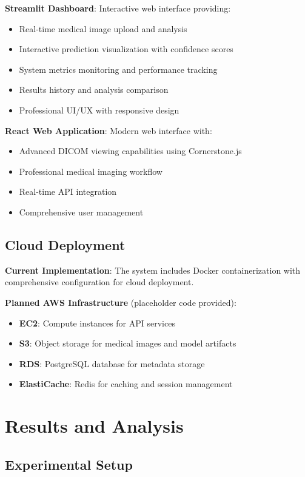\documentclass[12pt,a4paper]{article}
\begin{document}
\textbf{Streamlit Dashboard}: Interactive web interface providing:
\begin{itemize}
    \item Real-time medical image upload and analysis
    \item Interactive prediction visualization with confidence scores
    \item System metrics monitoring and performance tracking
    \item Results history and analysis comparison
    \item Professional UI/UX with responsive design
\end{itemize}

\textbf{React Web Application}: Modern web interface with:
\begin{itemize}
    \item Advanced DICOM viewing capabilities using Cornerstone.js
    \item Professional medical imaging workflow
    \item Real-time API integration
    \item Comprehensive user management
\end{itemize}

\subsection{Cloud Deployment}

\textbf{Current Implementation}: The system includes Docker containerization with comprehensive configuration for cloud deployment.

\textbf{Planned AWS Infrastructure} (placeholder code provided):
\begin{itemize}
    \item \textbf{EC2}: Compute instances for API services
    \item \textbf{S3}: Object storage for medical images and model artifacts
    \item \textbf{RDS}: PostgreSQL database for metadata storage
    \item \textbf{ElastiCache}: Redis for caching and session management
\end{itemize}

\section{Results and Analysis}

\subsection{Experimental Setup}
\end{document}
